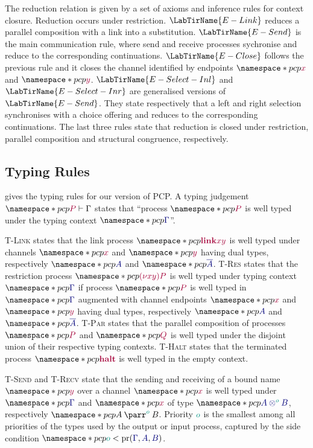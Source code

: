 The reduction relation is given by a set of axioms and inference rules for context closure. Reduction occurs under restriction. $\LabTirName{E-Link}$ reduces a parallel composition with a link into a substitution. $\LabTirName{E-Send}$ is the main communication rule, where send and receive processes sychronise and reduce to the corresponding continuations. $\LabTirName{E-Close}$ follows the previous rule and it closes the channel identified by endpoints $\pcp{\tm{x}}$ and $\pcp{\tm{y}}$. $\LabTirName{E-Select-Inl}$ and $\LabTirName{E-Select-Inr}$ are generalised versions of $\LabTirName{E-Send}$. They state respectively that a left and right selection synchronises with a choice offering and reduces to the corresponding continuations. The last three rules state that reduction is closed under restriction, parallel composition and structural congruence, respectively.



\subsection{Typing Rules}
 gives the typing rules for our version of PCP. A typing judgement $\pcp{\seq{P}{\Gamma}}$ states that ``process $\pcp{\tm{P}}$ is well typed under the typing context $\pcp{\ty{\Gamma}}$''.



\textsc{T-Link} states that the link process $\pcp{\tm{\link{x}{y}}}$ is well typed under channels $\pcp{\tm{x}}$ and $\pcp{\tm{y}}$ having dual types, respectively $\pcp{\ty{A}}$ and $\pcp{\ty{\co{A}}}$. \textsc{T-Res} states that the restriction process $\pcp{\tm{\res{x}{y}{P}}}$ is well typed under typing context $\pcp{\ty{\Gamma}}$ if process $\pcp{\tm{P}}$ is well typed in $\pcp{\ty{\Gamma}}$ augmented with channel endpoints $\pcp{\tm{x}}$ and $\pcp{\tm{y}}$ having dual types, respectively $\pcp{\ty{A}}$ and $\pcp{\ty{\co{A}}}$. \textsc{T-Par} states that the parallel composition of processes $\pcp{\tm{P}}$ and $\pcp{\tm{Q}}$ is well typed under the disjoint union of their respective typing contexts. \textsc{T-Halt} states that the terminated process $\pcp{\tm{\halt}}$ is well typed in the empty context.

\textsc{T-Send} and \textsc{T-Recv} state that the sending and receiving of a bound name $\pcp{\tm{y}}$ over a channel $\pcp{\tm{x}}$ is well typed under $\pcp{\ty{\Gamma}}$ and $\pcp{\tm{x}}$ of type $\pcp{\ty{\tytens[\cs{o}]{A}{B}}}$, respectively $\pcp{\typarr[\cs{o}]{A}{B}}$. Priority $\cs{o}$ is the smallest among all priorities of the types used by the output or input process, captured by the side condition $\pcp{\cs{o}<\minpr(\ty{\Gamma},\ty{A},\ty{B})}$.

